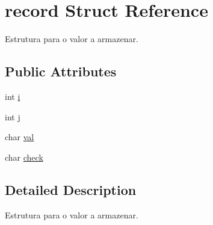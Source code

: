 \hypertarget{structrecord}{\section{record Struct Reference}
\label{structrecord}
}


Estrutura para o valor a armazenar.  


\subsection*{Public Attributes}
\begin{DoxyCompactItemize}
\item 
int \hyperlink{structrecord_ac301c80bc2c4273893b6d0b1045ebe4d}{i}
\item 
int \hyperlink{structrecord_a2c7b952c343a645f913aba063ac6bd8a}{j}
\item 
char \hyperlink{structrecord_a125d17b59037591de0a682688802f670}{val}
\item 
char \hyperlink{structrecord_a381a80a513768c3eba6b765c5e356bad}{check}
\end{DoxyCompactItemize}


\subsection{Detailed Description}
Estrutura para o valor a armazenar. 

